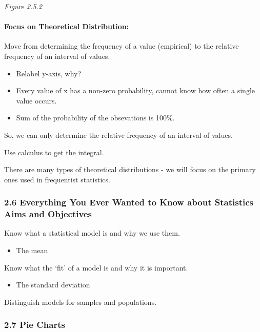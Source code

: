\documentclass[]{article}
\providecommand{\tightlist}{%
  \setlength{\itemsep}{0pt}\setlength{\parskip}{0pt}}
\let\oldparagraph\paragraph
\renewcommand{\paragraph}[1]{\oldparagraph{#1}\mbox{}}
\begin{document}
\emph{Figure 2.5.2}

\hypertarget{focus-on-theoretical-distribution}{%
\paragraph{Focus on Theoretical
Distribution:}\label{focus-on-theoretical-distribution}}

Move from determining the frequency of a value (empirical) to the
relative frequency of an interval of values.

\begin{itemize}
\tightlist
\item
  Relabel y-axis, why?
\item
  Every value of x has a non-zero probability, cannot know how often a
  single value occurs.
\item
  Sum of the probability of the obsevations is 100\%.
\end{itemize}

So, we can only determine the relative frequency of an interval of
values.

Use calculus to get the integral.

There are many types of theoretical distributions - we will focus on the
primary ones used in frequentist statistics.

\hypertarget{everything-you-ever-wanted-to-know-about-statistics-aims-and-objectives}{%
\subsubsection{2.6 Everything You Ever Wanted to Know about Statistics
Aims and
Objectives}\label{everything-you-ever-wanted-to-know-about-statistics-aims-and-objectives}}

Know what a statistical model is and why we use them.

\begin{itemize}
\tightlist
\item
  The mean
\end{itemize}

Know what the `fit' of a model is and why it is important.

\begin{itemize}
\tightlist
\item
  The standard deviation
\end{itemize}

Distinguish models for samples and populations.

\hypertarget{pie-charts}{%
\subsubsection{2.7 Pie Charts}\label{pie-charts}}
\end{document}
